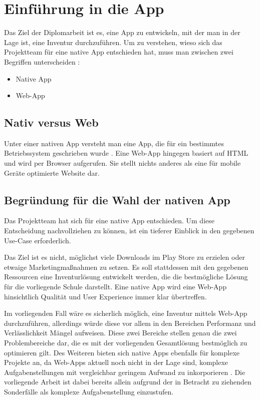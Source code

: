 \chapter{Einführung in die App}
\label{intro_app}
\renewcommand{\kapitelautor}{Autor: Josip Domazet}

Das Ziel der Diplomarbeit ist es, eine App zu entwickeln, mit der man in
der Lage ist, eine Inventur durchzuführen. Um zu verstehen, wieso sich
das Projektteam für eine native App entschieden hat, muss man zwischen
zwei Begriffen unterscheiden \cite{native-vs-web}:

\begin{itemize}
\tightlist
\item
  Native App
\item
  Web-App
\end{itemize}

\hypertarget{nativ-versus-web}{%
\section{Nativ versus Web}\label{nativ-versus-web}}

Unter einer nativen App versteht man eine App, die für ein bestimmtes
Betriebssystem geschrieben wurde \cite{native-definition}. Eine Web-App
hingegen basiert auf HTML und wird per Browser aufgerufen. Sie stellt
nichts anderes als eine für mobile Geräte optimierte Website dar.

\hypertarget{begruxfcndung-fuxfcr-die-wahl-der-nativen-app}{%
\section{Begründung für die Wahl der nativen
App}\label{begruxfcndung-fuxfcr-die-wahl-der-nativen-app}}

Das Projektteam hat sich für eine native App entschieden. Um diese
Entscheidung nachvollziehen zu können, ist ein tieferer Einblick in den
gegebenen Use-Case erforderlich.

Das Ziel ist es nicht, möglichst viele Downloads im Play Store zu
erzielen oder etwaige Marketingmaßnahmen zu setzen. Es soll stattdessen
mit den gegebenen Ressourcen eine Inventurlösung entwickelt werden, die
die bestmögliche Lösung für die vorliegende Schule darstellt. Eine
native App wird eine Web-App hinsichtlich Qualität und User Experience
immer klar übertreffen.

Im vorliegenden Fall wäre es sicherlich möglich, eine Inventur mittels
Web-App durchzuführen, allerdings würde diese vor allem in den Bereichen
Performanz und Verlässlichkeit Mängel aufweisen. Diese zwei Bereiche
stellen genau die zwei Problembereiche dar, die es mit der vorliegenden
Gesamtlösung bestmöglich zu optimieren gilt. Des Weiteren bieten sich
native Apps ebenfalls für komplexe Projekte an, da Web-Apps aktuell noch
nicht in der Lage sind, komplexe Aufgabenstellungen mit vergleichbar
geringem Aufwand zu inkorporieren \cite{complex-article}. Die
vorliegende Arbeit ist dabei bereits allein aufgrund der in Betracht zu
ziehenden Sonderfälle als komplexe Aufgabenstellung einzustufen.


